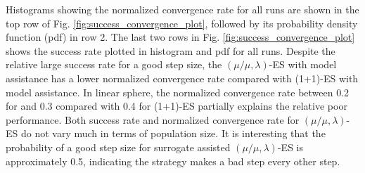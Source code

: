 Histograms showing the normalized convergence rate for all runs are shown in the top row of Fig. \ref{fig:success_convergence_plot}, followed by its probability density function (pdf) in row 2. The last two rows in Fig. \ref{fig:success_convergence_plot} shows the success rate plotted in histogram and pdf for all runs. Despite the relative large success rate for a good step size, the $(\mu/\mu,\lambda)$-ES with model assistance has a lower normalized convergence rate compared with (1+1)-ES with model assistance. In linear sphere, the normalized convergence rate between 0.2 for and 0.3 compared with 0.4 for (1+1)-ES partially explains the relative poor performance. Both success rate and normalized convergence rate for $(\mu/\mu,\lambda)$-ES do not vary much in terms of population size. It is interesting that the probability of a good step size for surrogate assisted $(\mu/\mu,\lambda)$-ES is approximately 0.5, indicating the strategy makes a bad step every other step.  























 
